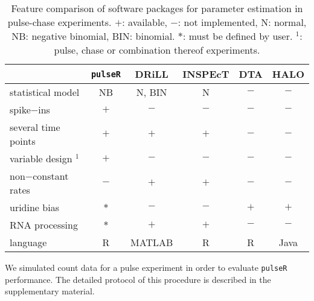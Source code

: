 \begin{table}[tbh]
 \vspace*{-.4cm}
 \begin{tabular}{|l|c|c|c|c|c|}\hline
                        &\verb|pulseR| &DRiLL          &INSPEcT&DTA    &HALO       \\\hline
 statistical model      & NB           &N, BIN         &N       & $-$  & $-$      \\\hline                         
 spike$-$ins            & $+$          &   $-$         &  $-$   &  $-$ & $-$         \\\hline               
 several time points    & $+$          &   $+$         &  $+$   &  $-$ & $-$         \\\hline                    
  variable design $^1$  & $+$          &   $-$         &  $-$   &  $-$ & $-$         \\\hline 
 non$-$constant rates   & $-$          &   $+$         &  $+$   &  $-$ & $-$         \\\hline 
      uridine bias      & $\ast$       &   $-$         &  $-$   &  $+$ & $+$         \\\hline 
       RNA processing   &$\ast$        &   $+$         &  $+$   &  $-$ & $-$         \\\hline 
  language              & R            &MATLAB         &  R     &  R   & Java      \\\hline 
 \end{tabular}
 \vspace*{.1cm}
\caption{
Feature comparison of software packages for parameter estimation in 
pulse-chase experiments. 
$+$: available, $-$: not implemented,
N: normal, NB: negative binomial, BIN: binomial.
$\ast$: must be defined by user. $^1$: pulse, chase or combination thereof experiments.
 \vspace*{-.7cm}
}
\end{table}
We simulated count data for a pulse experiment 
in order to evaluate \verb|pulseR| performance.
The  detailed protocol of this procedure is described in the supplementary material.

